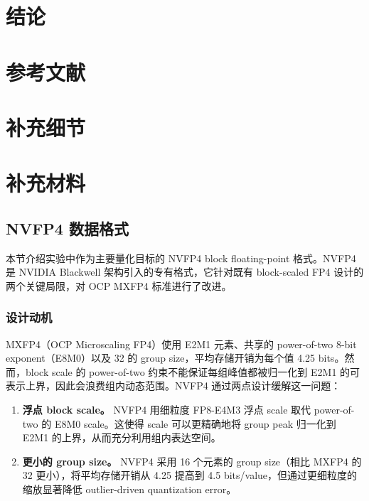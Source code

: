 \documentclass{article}
\begin{document}
\section{结论}

\section*{参考文献}

{
\small
}


\appendix

\section{补充细节}
\section{补充材料}
\subsection{NVFP4 数据格式}
\label{app:nvfp4}

本节介绍实验中作为主要量化目标的 NVFP4 block floating-point 格式。NVFP4 是 NVIDIA Blackwell 架构引入的专有格式，它针对既有
block-scaled FP4 设计的两个关键局限，对 OCP MXFP4 标准进行了改进。

\subsubsection{设计动机}

MXFP4（OCP Microscaling FP4）使用 E2M1 元素、共享的 power-of-two 8-bit exponent（E8M0）以及
32 的 group size，平均存储开销为每个值 4.25 bits。然而，block scale 的 power-of-two 约束不能保证每组峰值都被归一化到
E2M1 的可表示上界，因此会浪费组内动态范围。NVFP4 通过两点设计缓解这一问题：

\begin{enumerate}
\item \textbf{浮点 block scale。} NVFP4 用细粒度 FP8-E4M3 浮点 scale 取代 power-of-two 的 E8M0
scale。这使得 scale 可以更精确地将 group peak 归一化到 E2M1 的上界，从而充分利用组内表达空间。

\item \textbf{更小的 group size。} NVFP4 采用 16 个元素的 group size（相比 MXFP4 的 32 更小），将平均存储开销从
4.25 提高到 4.5 bits/value，但通过更细粒度的缩放显著降低 outlier-driven quantization error。
\end{enumerate}
\end{document}

